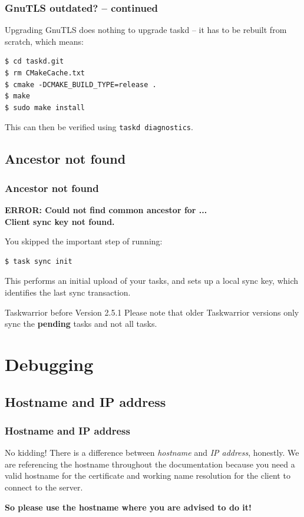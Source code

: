 \documentclass[t,handout]{beamer}
\begin{document}
\begin{frame}[fragile]\frametitle{GnuTLS outdated? -- continued}
    Upgrading GnuTLS does nothing to upgrade taskd -- it has to be rebuilt from scratch, which means:

    \begin{lstlisting}
$ cd taskd.git
$ rm CMakeCache.txt
$ cmake -DCMAKE_BUILD_TYPE=release .
$ make
$ sudo make install\end{lstlisting}

    This can then be verified using \verb+taskd diagnostics+.
\end{frame}

\subsection{Ancestor not found}

\begin{frame}[fragile]\frametitle{Ancestor not found}
    \textbf{ERROR: Could not find common ancestor for ...\\
Client sync key not found.}

    You skipped the important step of running:
    \begin{lstlisting}
$ task sync init\end{lstlisting}

    This performs an initial upload of your tasks, and sets up a local sync key, which identifies the last sync transaction.

    \begin{alertblock}{Taskwarrior before Version 2.5.1}
        Please note that older Taskwarrior versions only sync the \textbf{pending} tasks and not all tasks.
    \end{alertblock}
\end{frame}

\section{Debugging}

\subsection{Hostname and IP address}

\begin{frame}[fragile]\frametitle{Hostname and IP address}
    \vfill
    \begin{alertblock}{No kidding!}
        There is a difference between \textit{hostname} and \textit{IP address}, honestly. We are referencing the hostname throughout the documentation because you need a valid hostname for the certificate and working name resolution for the client to connect to the server.

        \textbf{So please use the hostname where you are advised to do it!}
    \end{alertblock}
    \vfill
\end{frame}
\end{document}
